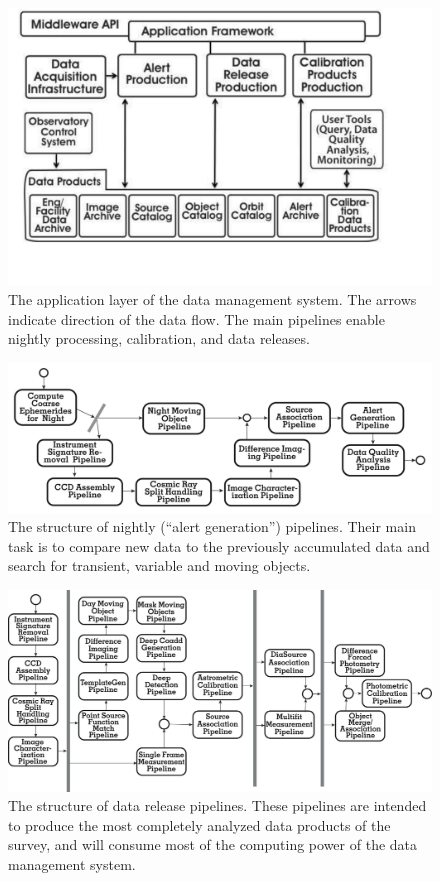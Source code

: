 \documentclass{emulateapj}
\begin{document}
\begin{figure}[t!]
\hskip -0.1in
\includegraphics[width=1.15\hsize,clip]{DMp2.pdf}
\vskip -0.3in
\caption{The application layer of the data management system. The arrows indicate
direction of the data flow. The main pipelines enable nightly processing,
calibration, and data releases.} 
\label{Fig:DM4}
\end{figure}

\begin{figure}
\includegraphics[width=1.0\hsize,clip]{DMp4.pdf}
\caption{The structure of nightly (``alert generation'') pipelines. 
Their main task is to compare new data to the previously accumulated data and search for 
transient, variable and moving objects.} 
\label{Fig:DM5}
\end{figure}

\begin{figure}[t!]
\hskip 0.3in
\includegraphics[width=0.92\hsize,clip]{DMp3.pdf}
\caption{The structure of data release pipelines.
These pipelines are intended to produce the most completely analyzed data products 
of the survey, and will consume most of the computing power of the data management 
system.} 
\label{Fig:DM6}
\end{figure}
\end{document}

